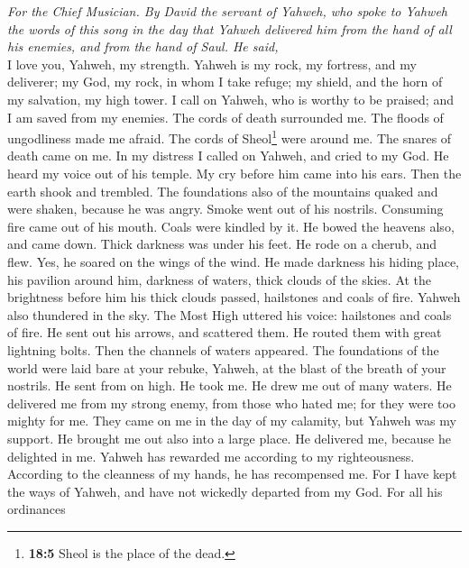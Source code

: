 \emph{For the Chief Musician. By David the servant of Yahweh, who spoke
to Yahweh the words of this song in the day that Yahweh delivered him
from the hand of all his enemies, and from the hand of Saul. He said,}\\
 I love you, Yahweh, my strength.  Yahweh is
my rock, my fortress, and my deliverer; my God, my rock, in whom I take
refuge; my shield, and the horn of my salvation, my high tower.
 I call on Yahweh, who is worthy to be praised; and I am
saved from my enemies.  The cords of death surrounded me.
The floods of ungodliness made me afraid.  The cords of
Sheol\footnote{\textbf{18:5} Sheol is the place of the dead.} were
around me. The snares of death came on me.  In my distress
I called on Yahweh, and cried to my God. He heard my voice out of his
temple. My cry before him came into his ears.  Then the
earth shook and trembled. The foundations also of the mountains quaked
and were shaken, because he was angry.  Smoke went out of
his nostrils. Consuming fire came out of his mouth. Coals were kindled
by it.  He bowed the heavens also, and came down. Thick
darkness was under his feet.  He rode on a cherub, and
flew. Yes, he soared on the wings of the wind.  He made
darkness his hiding place, his pavilion around him, darkness of waters,
thick clouds of the skies.  At the brightness before him
his thick clouds passed, hailstones and coals of fire. 
Yahweh also thundered in the sky. The Most High uttered his voice:
hailstones and coals of fire.  He sent out his arrows,
and scattered them. He routed them with great lightning bolts.
 Then the channels of waters appeared. The foundations of
the world were laid bare at your rebuke, Yahweh, at the blast of the
breath of your nostrils.  He sent from on high. He took
me. He drew me out of many waters.  He delivered me from
my strong enemy, from those who hated me; for they were too mighty for
me.  They came on me in the day of my calamity, but
Yahweh was my support.  He brought me out also into a
large place. He delivered me, because he delighted in me.
 Yahweh has rewarded me according to my righteousness.
According to the cleanness of my hands, he has recompensed me.
 For I have kept the ways of Yahweh, and have not
wickedly departed from my God.  For all his ordinances
